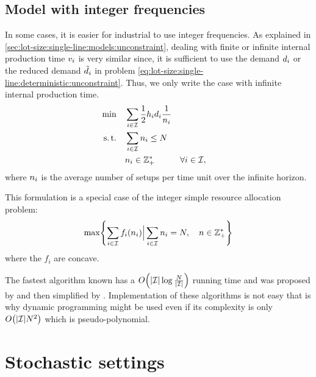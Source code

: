 


\subsection{Model with integer frequencies}


In some cases, it is easier for industrial to use integer frequencies.
As explained in \cref{sec:lot-size:single-line:models:unconstraint}, dealing with finite or infinite internal production time $v_i$ is very similar since, it is sufficient to use the demand $d_i$ or the reduced demand $\tilde{d}_i$ in problem \eqref{eq:lot-size:single-line:deterministic:unconstraint}.
Thus, we only write the case with infinite internal production time.
\begin{subequations}\label{eq:lot-size:single-line:deterministic:integer}
  \begin{align}
  \min\quad & \displaystyle\sum_{i\in\mathcal{I}} \frac{1}{2}h_id_i\frac{1}{n_i}
  \label{eq:lot-size:single-line:deterministic:integer:objective}
  \\
  \operatorname{s.t.}\quad  & \displaystyle\sum_{i\in\mathcal{I}} n_i \le N
  \label{eq:lot-size:single-line:deterministic:integer:flexibility}
  \\
       & n_i \in \mathbb{Z}_+^* && \forall i\in\mathcal{I},
  \label{eq:lot-size:single-line:deterministic:integer:positivity}
  \end{align}
\end{subequations}
where $n_i$ is the average number of setups per time unit over the infinite horizon.


This formulation is a special case of the integer simple resource allocation problem:
\begin{equation}
  \max\crbracket{\sum_{i\in\REF} f_i\bracket{\freq_i} \Big| \sum_{i\in\REF}\freq_i=\nbsetups,\quad\freq\in \ZZ_+^*}
\end{equation}
where the $f_i$ are concave.

The fastest algorithm known has a $O\bracket{\card{\REF}\log{\frac{\nbsetups}{\card{\REF}}}}$ running time and was proposed by \cite{Frederickson1982} and then simplified by \cite{Hochbaum1994}. Implementation of these algorithms is not easy that is why dynamic programming might be used even if its complexity is only $O\bracket{\card{\REF}\nbsetups^2}$ which is pseudo-polynomial.



\section{Stochastic settings}


